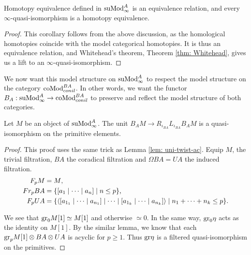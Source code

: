 \documentclass[../thesis.tex]{subfiles}
\begin{document}
            \begin{corollary}
                Homotopy equivalence defined in $\tt{suMod}_\infty^A$ is an equivalence relation, and every $\infty$-quasi-isomorphism is a homotopy equivalence.
            \end{corollary}

            \begin{proof}
                This corollary follows from the above discussion, as the homological homotopies coincide with the model categorical homotopies. It is thus an equivalence relation, and Whitehead's theorem, Theorem \ref{thm: Whitehead}, gives us a lift to an $\infty$-quasi-isomorphism.
            \end{proof}

            We now want this model structure on $\tt{suMod}^A_\infty$ to respect the model structure on the category $\tt{coMod}_{conil}^{BA}$. In other words, we want the functor $B_A: \tt{suMod}_\infty^A \to \tt{coMod}_{conil}^{BA}$ to preserve and reflect the model structure of both categories.

            \begin{lemma}
                Let $M$ be an object of $\tt{suMod}_\infty^A$. The unit $B_AM \to R_{\iota_{BA}}L_{\iota_{BA}}B_AM$ is a quasi-isomorphism on the primitive elements.
            \end{lemma}

            \begin{proof}
                This proof uses the same trick as Lemma \ref{lem: uni-twist-ac}. Equip $M$, the trivial filtration, $BA$ the coradical filtration and $\Omega BA = UA$ the induced filtration.
                \begin{align*}
                    F_pM & = M\tt{,} \\
                    Fr_pBA & = \startset{[a_1 \mid \cdots \mid a_n] \mid n \leq p}\tt{,} \\
                    F_p UA & = \startset{\langle [a_{1_1} \mid \cdots \mid a_{n_1}] \mid \cdots \mid [a_{1_k} \mid \cdots \mid a_{n_k}] \rangle \mid n_1 + \cdots + n_k \leq p}\tt{.}
                \end{align*} 

                We see that $\tt{gr}_0M[1] \simeq M[1]$ and otherwise $\simeq 0$. In the same way, $\tt{gr}_0\eta$ acts as the identity on $M[1]$. By the similar lemma, we know that each $\tt{gr}_p M[1] \otimes BA \otimes UA$ is acyclic for $p \geq 1$. Thus $\tt{gr}\eta$ is a filtered quasi-isomorphism on the primitives.

            \end{proof}
\end{document}
